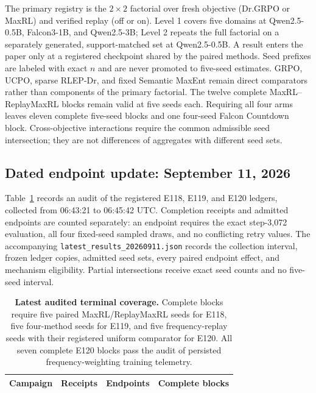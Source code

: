 \documentclass{article}
\newcommand{\1}{\mathbf 1}
\theoremstyle{remark}
\theoremstyle{definition}
\theoremstyle{plain}
\begin{document}
The primary registry is the $2\times2$ factorial over fresh objective
(Dr.GRPO or MaxRL) and verified replay (off or on). Level 1 covers five domains
at Qwen2.5-0.5B, Falcon3-1B, and Qwen2.5-3B; Level 2 repeats the full factorial
on a separately generated, support-matched set at Qwen2.5-0.5B. A result enters
the paper only at a registered checkpoint shared by the paired methods. Seed
prefixes are labeled with exact $n$ and are never promoted to five-seed
estimates. GRPO, UCPO, sparse RLEP-Dr, and fixed Semantic MaxEnt remain direct
comparators rather than components of the primary factorial. The twelve complete
MaxRL--ReplayMaxRL blocks remain valid at five seeds each. Requiring all four
arms leaves eleven complete five-seed blocks and one four-seed Falcon Countdown
block. Cross-objective interactions require the common admissible seed
intersection; they are not differences of aggregates with different seed sets.


\subsection{Dated endpoint update: September 11, 2026}
\label{app:latest-results-update}

Table~\ref{tab:latest-results-update} records an audit of the registered
E118, E119, and E120 ledgers, collected from 06:43:21 to 06:45:42 UTC.
Completion receipts and admitted endpoints are counted separately: an endpoint
requires the exact step-3,072 evaluation, all four fixed-seed sampled draws,
and no conflicting retry values. The accompanying
\texttt{latest\_results\_20260911.json} records the collection interval,
frozen ledger copies, admitted seed sets, every paired endpoint effect, and
mechanism eligibility. Partial intersections receive exact seed counts and
no five-seed interval.

\begin{table}[H]
  \centering
  \caption{\textbf{Latest audited terminal coverage.}
  Complete blocks require five paired MaxRL/ReplayMaxRL seeds for E118,
  five four-method seeds for E119, and five frequency-replay seeds with
  their registered uniform comparator for E120. All seven complete E120 blocks
  pass the audit of persisted frequency-weighting training telemetry.}
  \label{tab:latest-results-update}
  \small
  \setlength{\tabcolsep}{5pt}
  \begin{tabular}{@{}lrrr@{}}
    \toprule
    \textbf{Campaign} & \textbf{Receipts} & \textbf{Endpoints}
      & \textbf{Complete blocks} \\
    \midrule
    
  \end{tabular}
\end{table}
\end{document}
